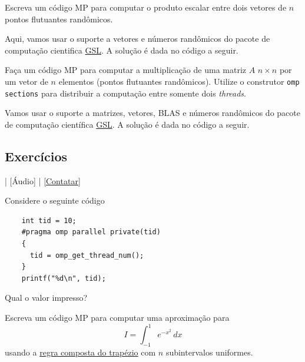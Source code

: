 \begin{exeresol}\label{exeresol:produto_escalar}
  Escreva um código MP para computar o produto escalar entre dois vetores de $n$ pontos flutuantes randômicos.
\end{exeresol}
\begin{resol}
  Aqui, vamos usar o suporte a vetores e números randômicos do pacote de computação cientifica \href{https://www.gnu.org/software/gsl/}{GSL}. A solução é dada no código a seguir.

  
\end{resol}

\begin{exeresol}\label{exeresol:cc_AxSecoes}
  Faça um código MP para computar a multiplicação de uma matriz $A$ $n\times n$ por um vetor de $n$ elementos (pontos flutuantes randômicos). Utilize o construtor \verb+omp sections+ para distribuir a computação entre somente dois {\it threads}.
\end{exeresol}
\begin{resol}
  Vamos usar o suporte a matrizes, vetores, BLAS e números randômicos do pacote de computação científica \href{https://www.gnu.org/software/gsl/}{GSL}. A solução é dada no código a seguir.

  
\end{resol}

\subsection*{Exercícios}

\begin{flushright}
  [Vídeo] | [Áudio] | \href{https://phkonzen.github.io/notas/contato.html}{[Contatar]}
\end{flushright}

\begin{exer}
  Considere o seguinte código
  \begin{lstlisting}
    int tid = 10;
    #pragma omp parallel private(tid)
    {
      tid = omp_get_thread_num();
    }
    printf("%d\n", tid);
  \end{lstlisting}
  Qual o valor impresso?
\end{exer}

\begin{exer}\label{exer:cc_trap}
  Escreva um código MP para computar uma aproximação para
  \begin{equation}
    I = \int_{-1}^{1} e^{-x^2}\,dx
  \end{equation}
  usando a \href{https://phkonzen.github.io/notas/MatematicaNumerica/cap_integr_sec_int_comp.html}{regra composta do trapézio} com $n$ subintervalos uniformes.
\end{exer}

